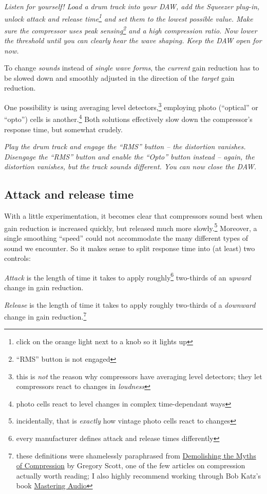 \emph{Listen for yourself!  Load a drum track into your DAW, add the
  Squeezer plug-in, unlock attack and release time\footnote{click on
    the orange light next to a knob so it lights up} and set them to
  the lowest possible value.  Make sure the compressor uses peak
  sensing\footnote{``RMS'' button is not engaged} and a high
  compression ratio.  Now lower the threshold until you can clearly
  hear the wave shaping.  Keep the DAW open for now.}

To change \emph{sounds} instead of \emph{single wave forms}, the
\emph{current} gain reduction has to be slowed down and smoothly
adjusted in the direction of the \emph{target} gain reduction.

One possibility is using averaging level detectors,\footnote{this is
  \emph{not} the reason why compressors have averaging level
  detectors; they let compressors react to changes in \emph{loudness}}
employing photo (``optical'' or ``opto'') cells is
another.\footnote{photo cells react to level changes in complex
  time-dependant ways} Both solutions effectively slow down the
compressor's response time, but somewhat crudely.

\emph{Play the drum track and engage the ``RMS'' button -- the
  distortion vanishes.  Disengage the ``RMS'' button and enable the
  ``Opto'' button instead -- again, the distortion vanishes, but the
  track sounds different.  You can now close the DAW.}

\subsection{Attack and release time}
\label{sec:attack_and_release_time}

With a little experimentation, it becomes clear that compressors sound
best when gain reduction is increased quickly, but released much more
slowly.\footnote{incidentally, that is \emph{exactly} how vintage
  photo cells react to changes} Moreover, a single smoothing ``speed''
could not accommodate the many different types of sound we encounter.
So it makes sense to split response time into (at least) two controls:

\emph{Attack} is the length of time it takes to apply
roughly\footnote{every manufacturer defines attack and release times
  differently} two-thirds of an \emph{upward} change in gain
reduction.

\emph{Release} is the length of time it takes to apply roughly
two-thirds of a \emph{downward} change in gain
reduction.\footnote{these definitions were shamelessly paraphrased
  from
  \href{https://www.attackmagazine.com/features/columns/gregory-scott-demolishing-the-myths-of-compression/}{Demolishing
    the Myths of Compression} by Gregory Scott, one of the few
  articles on compression actually worth reading; I also highly
  recommend working through Bob Katz's book
  \href{https://www.soundonsound.com/reviews/bob-katz-mastering-audio}{Mastering
    Audio}}

